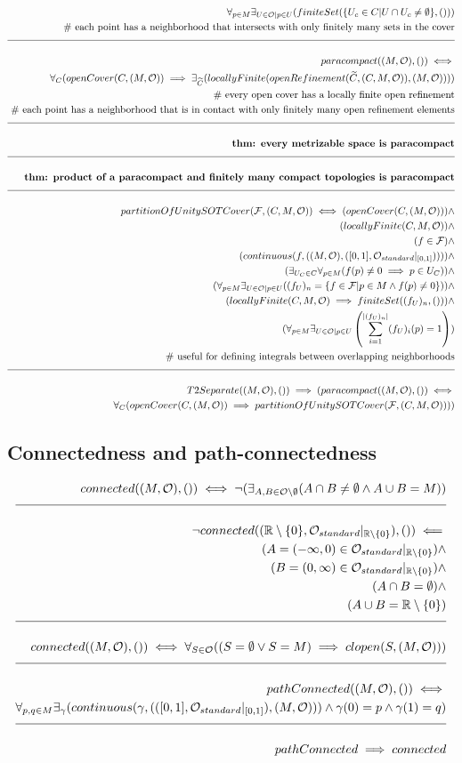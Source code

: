 \documentclass[a4paper]{article}
\newcommand{\eqComment}[1]{\text{  \# #1}}
\newcommand{\n}{\\[1.5ex] \hline \nonumber \\[0ex]}
\newcommand{\m}{\nonumber \\}
\begin{document}
\begin{tcolorbox}
\begin{align}
\m \forall_{p \in M} \exists_{U \in \mathcal{O}| p \in U} (finiteSet(\{U_c \in C| U \cap U_c \neq \emptyset\}, ()))
\m \eqComment{each point has a neighborhood that intersects with only finitely many sets in the cover}
\n paracompact((M, \mathcal{O}), ()) \iff 
\m \forall_{C} (openCover(C, (M, \mathcal{O})) \implies \exists_{\widetilde{C}} (locallyFinite(openRefinement(\widetilde{C}, (C, M, \mathcal{O})), (M, \mathcal{O}))))
\m \eqComment{every open cover has a locally finite open refinement}
\m \eqComment{each point has a neighborhood that is in contact with only finitely many open refinement elements}
\n \textbf{thm: every metrizable space is paracompact}
\n \textbf{thm: product of a paracompact and finitely many compact topologies is paracompact}
\n partitionOfUnitySOTCover(\mathcal{F}, (C, M, \mathcal{O})) \iff (openCover(C, (M, \mathcal{O}))) \land
\m (locallyFinite(C, M, \mathcal{O})) \land
\m (f \in \mathcal{F}) \land
\m (continuous(f, ((M, \mathcal{O}), ([0, 1], \mathcal{O}_{standard}|_{[0 ,1]})))) \land
\m (\exists_{U_C \in C} \forall_{p \in M} (f(p) \neq 0 \implies p \in U_C)) \land
\m (\forall_{p \in M} \exists_{U \in \mathcal{O}| p \in U} ((f_U)_n = \{f \in \mathcal{F}| p \in M \land f(p) \neq 0\})) \land
\m (locallyFinite(C, M, \mathcal{O}) \implies finiteSet((f_U)_n, ())) \land
\m (\forall_{p \in M} \exists_{U \in \mathcal{O}| p \in U} \left(\sum_{i = 1}^{|(f_U)_n|} (f_U)_i(p) = 1 \right))
\m \eqComment{useful for defining integrals between overlapping neighborhoods}
\n T2Separate((M, \mathcal{O}), ()) \implies (paracompact((M, \mathcal{O}), ()) \iff 
\m \forall_{C} (openCover(C, (M, \mathcal{O})) \implies partitionOfUnitySOTCover(\mathcal{F}, (C, M, \mathcal{O}))))
\end {align}
\end{tcolorbox}

\subsection{Connectedness and path-connectedness}
\begin{tcolorbox}
\begin{align}
   connected((M, \mathcal{O}), ()) \iff \lnot (\exists_{A, B \in \mathcal{O} \setminus \emptyset} (A \cap B \neq \emptyset \land A \cup B = M))
\n \lnot connected((\mathbb{R} \setminus \{0\}, \mathcal{O}_{standard}|_{\mathbb{R} \setminus \{0\}}), ()) \impliedby
\m (A = (-\infty, 0) \in \mathcal{O}_{standard}|_{\mathbb{R} \setminus \{0\}}) \land 
\m (B = (0, \infty) \in \mathcal{O}_{standard}|_{\mathbb{R} \setminus \{0\}}) \land
\m (A \cap B = \emptyset) \land
\m (A \cup B = \mathbb{R} \setminus \{0\})
\n connected((M, \mathcal{O}), ()) \iff \forall_{S \in \mathcal{O}} ((S = \emptyset \lor S = M) \implies clopen(S, (M, \mathcal{O})))
\n pathConnected((M, \mathcal{O}), ()) \iff 
\m \forall_{p, q \in M} \exists_{\gamma} (continuous(\gamma, (([0, 1], \mathcal{O}_{standard}|_{[0 ,1]}), (M, \mathcal{O}))) \land \gamma(0) = p \land \gamma(1) = q)
\n pathConnected \implies connected
\end {align}
\end{tcolorbox}
\end{document}
